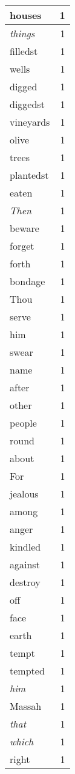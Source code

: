\begin{center}
\begin{longtable}{l|r}
houses & 1 \\ \hline
\emph{things} & 1 \\ \hline
filledst & 1 \\ \hline
wells & 1 \\ \hline
digged & 1 \\ \hline
diggedst & 1 \\ \hline
vineyards & 1 \\ \hline
olive & 1 \\ \hline
trees & 1 \\ \hline
plantedst & 1 \\ \hline
eaten & 1 \\ \hline
\emph{Then} & 1 \\ \hline
beware & 1 \\ \hline
forget & 1 \\ \hline
forth & 1 \\ \hline
bondage & 1 \\ \hline
Thou & 1 \\ \hline
serve & 1 \\ \hline
him & 1 \\ \hline
swear & 1 \\ \hline
name & 1 \\ \hline
after & 1 \\ \hline
other & 1 \\ \hline
people & 1 \\ \hline
round & 1 \\ \hline
about & 1 \\ \hline
For & 1 \\ \hline
jealous & 1 \\ \hline
among & 1 \\ \hline
anger & 1 \\ \hline
kindled & 1 \\ \hline
against & 1 \\ \hline
destroy & 1 \\ \hline
off & 1 \\ \hline
face & 1 \\ \hline
earth & 1 \\ \hline
tempt & 1 \\ \hline
tempted & 1 \\ \hline
\emph{him} & 1 \\ \hline
Massah & 1 \\ \hline
\emph{that} & 1 \\ \hline
\emph{which} & 1 \\ \hline
right & 1 \\ \hline

\end{longtable}
\end{center}
